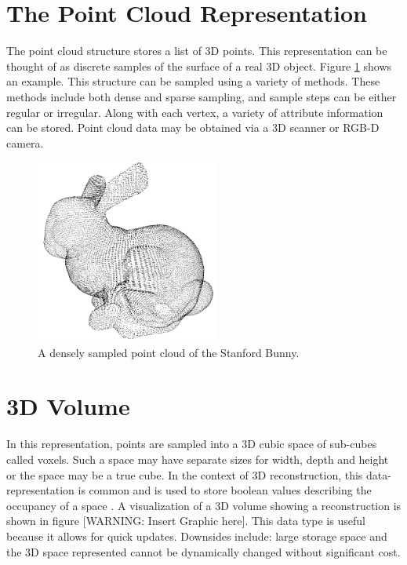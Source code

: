 \section{The Point Cloud Representation}

The point cloud structure stores a list of 3D points. This representation can be thought of as discrete samples of the surface of a real 3D object. Figure \ref{PointCloudExample} shows an example. This structure can be sampled using a variety of methods. These methods include both dense and sparse sampling, and sample steps can be either regular or irregular. Along with each vertex, a variety of attribute information can be stored. Point cloud data may be obtained via a 3D scanner or RGB-D camera. 

\begin{figure}[!h]
\centering
\includegraphics[width=6cm]{images/ch2/PointCloudExample}
\caption{A densely sampled point cloud of the Stanford Bunny.}
\label{PointCloudExample}
\end{figure}


\section{3D Volume}

In this representation, points are sampled into a 3D cubic space of sub-cubes called voxels. Such a space may have separate sizes for width, depth and height or the space may be a true cube. In the context of 3D reconstruction, this data-representation is common and is used to store boolean values describing the occupancy of a space \cite{Rusinkiewicz02Real}. A visualization of a 3D volume showing a reconstruction is shown in figure [WARNING: Insert Graphic here]. This data type is useful because it allows for quick updates. Downsides include: large storage space and the 3D space represented cannot be dynamically changed without significant cost.


